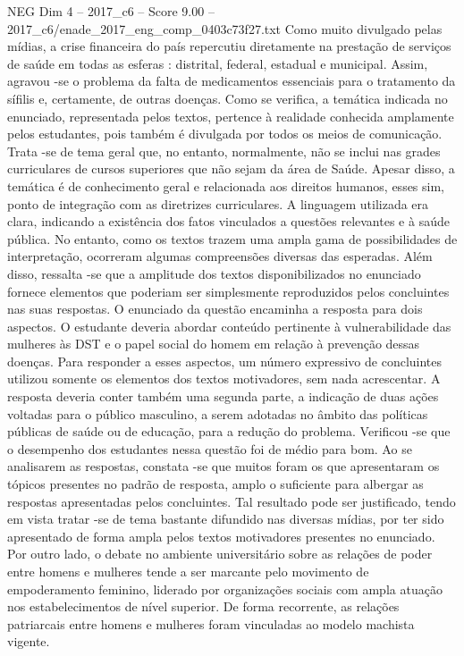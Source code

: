 \begin{textsample}{NEG Dim 4 – 2017\_c6 – Score 9.00 – 2017\_c6/enade\_2017\_eng\_comp\_0403c73f27.txt}
Como muito divulgado pelas mídias, a crise financeira do país repercutiu diretamente na prestação de serviços de saúde em todas as esferas : distrital, federal, estadual e municipal.
Assim, agravou -se o problema da falta de medicamentos essenciais para o tratamento da sífilis e, certamente, de outras doenças.
Como se verifica, a temática indicada no enunciado, representada pelos textos, pertence à realidade conhecida amplamente pelos estudantes, pois também é divulgada por todos os meios de comunicação.
Trata -se de tema geral que, no entanto, normalmente, não se inclui nas grades curriculares de cursos superiores que não sejam da área de Saúde.
Apesar disso, a temática é de conhecimento geral e relacionada aos direitos humanos, esses sim, ponto de integração com as diretrizes curriculares.
A linguagem utilizada era clara, indicando a existência dos fatos vinculados a questões relevantes e à saúde pública.
No entanto, como os textos trazem uma ampla gama de possibilidades de interpretação, ocorreram algumas compreensões diversas das esperadas.
Além disso, ressalta -se que a amplitude dos textos disponibilizados no enunciado fornece elementos que poderiam ser simplesmente reproduzidos pelos concluintes nas suas respostas.
O enunciado da questão encaminha a resposta para dois aspectos.
O estudante deveria abordar conteúdo pertinente à vulnerabilidade das mulheres às DST e o papel social do homem em relação à prevenção dessas doenças.
Para responder a esses aspectos, um número expressivo de concluintes utilizou somente os elementos dos textos motivadores, sem nada acrescentar.
A resposta deveria conter também uma segunda parte, a indicação de duas ações voltadas para o público masculino, a serem adotadas no âmbito das políticas públicas de saúde ou de educação, para a redução do problema.
Verificou -se que o desempenho dos estudantes nessa questão foi de médio para bom.
Ao se analisarem as respostas, constata -se que muitos foram os que apresentaram os tópicos presentes no padrão de resposta, amplo o suficiente para albergar as respostas apresentadas pelos concluintes.
Tal resultado pode ser justificado, tendo em vista tratar -se de tema bastante difundido nas diversas mídias, por ter sido apresentado de forma ampla pelos textos motivadores presentes no enunciado.
Por outro lado, o debate no ambiente universitário sobre as relações de poder entre homens e mulheres tende a ser marcante pelo movimento de empoderamento feminino, liderado por organizações sociais com ampla atuação nos estabelecimentos de nível superior.
De forma recorrente, as relações patriarcais entre homens e mulheres foram vinculadas ao modelo machista vigente.

\end{textsample}
